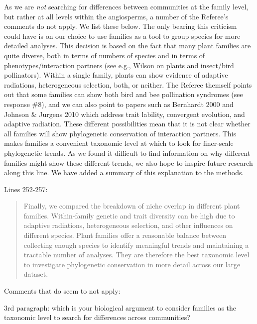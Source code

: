 \documentclass[12pt]{letter}
\newenvironment{refquote}{\bigskip \begin{it}}{\end{it}\smallskip}
\begin{document}
		As we are \emph{not} searching for differences between communities at the family level, but rather at all levels within the angiosperms, a number of the Referee's comments do not apply. We list these below. The only bearing this criticism could have is on our choice to use families as a tool to group species for more detailed analyses. This decision is based on the fact that many plant families are quite diverse, both in terms of numbers of species and in terms of phenotypes/interaction partners (see e.g., Wilson on plants and insect/bird pollinators). Within a single family, plants can show evidence of adaptive radiations, heterogeneous selection, both, or neither. The Referee themself points out that some families can show both bird and bee pollination syndromes (see response \#8), and we can also point to papers such as Bernhardt 2000 and Johnson \& Jurgens 2010 which address trait lability, convergent evolution, and adaptive radiation. These different possibilities mean that it is not clear whether all families will show phylogenetic conservation of interaction partners. This makes families a convenient taxonomic level at which to look for finer-scale phylogenetic trends. As we found it difficult to find information on why  different families might show these different trends, we also hope to inspire future research along this  line. We have added a summary of this explanation to the methods. 


		Lines 252-257:

		\begin{quotation}

			Finally, we compared the breakdown of niche overlap in different plant families.
		    Within-family genetic and trait diversity can be high due to adaptive radiations, heterogeneous selection, and other influences on different species. 
		    Plant families offer a reasonable balance between collecting enough species to identify meaningful trends and maintaining a tractable number of analyses. 
		    They are therefore the best taxonomic level to investigate phylogenetic conservation in more detail across our large dataset.

		\end{quotation}


		Comments that do seem to not apply:


		\begin{refquote}
		3rd paragraph:  which is your biological argument to consider families as the taxonomic level to search for differences across communities?
		\end{refquote}
\end{document}
